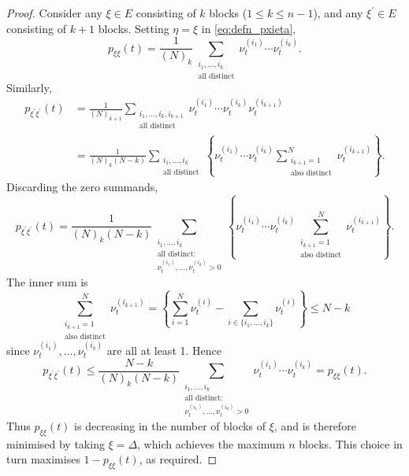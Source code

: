 \begin{proof}
Consider any $\xi \in E$ consisting of $k$ blocks ($1\leq k\leq n-1$), and any $\xi^\prime\in E$ consisting of $k+1$ blocks. 
Setting $\eta=\xi$ in \eqref{eq:defn_pxieta},
\begin{equation*}
p_{\xi\xi}(t) 
= \frac{1}{(N)_k} \sum_{\substack{i_1,\dots,i_k \\ \text{all distinct}}} 
        \nu_t^{(i_1)} \cdots \nu_t^{(i_k)} .
\end{equation*}
Similarly,
\begin{align*}
p_{\xi^\prime\xi^\prime}(t) &= \frac{1}{(N)_{k+1}} 
        \sum_{\substack{i_1,\dots,i_k, i_{k+1} \\ \text{all distinct}}} 
        \nu_t^{(i_1)} \cdots \nu_t^{(i_k)} \nu_t^{(i_{k+1})} \\
&= \frac{1}{(N)_k(N-k)} \sum_{\substack{i_1,\dots,i_k \\ \text{all distinct}}} 
        \left\{ \nu_t^{(i_1)} \cdots \nu_t^{(i_k)} 
        \sum_{\substack{i_{k+1}=1 \\ \text{also distinct}}}^N 
        \nu_t^{(i_{k+1})} \right\} .
\end{align*}
Discarding the zero summands,
\begin{equation*}
p_{\xi^\prime\xi^\prime}(t) 
= \frac{1}{(N)_k(N-k)} \sum_{\substack{i_1,\dots,i_k \\ \text{all distinct:} \\
        \nu_t^{(i_1)},\dots,\nu_t^{(i_k)} > 0 }} 
        \left\{ \nu_t^{(i_1)} \cdots \nu_t^{(i_k)} 
        \sum_{\substack{i_{k+1}=1 \\ 
        \text{also distinct}}}^N \nu_t^{(i_{k+1})} \right\} .
\end{equation*}
The inner sum is
\begin{equation*}
\sum_{\substack{i_{k+1}=1 \\ \text{also distinct}}}^N \nu_t^{(i_{k+1})} 
= \left\{ \sum_{i=1}^N \nu_t^{(i)} -  \sum_{i\in\{i_1,\dots,i_k\} } 
        \nu_t^{(i)} \right\}
\leq N - k
\end{equation*}
since $\nu_t^{(i_1)},\dots,\nu_t^{(i_k)} $ are all at least 1.
Hence
\begin{equation*}
p_{\xi^\prime\xi^\prime}(t)
\leq  \frac{N-k}{(N)_k(N-k)} \sum_{\substack{i_1,\dots,i_k \\ \text{all distinct:} \\ \nu_t^{(i_1)},\dots,\nu_t^{(i_k)} > 0 }} \nu_t^{(i_1)} \cdots \nu_t^{(i_k)} 
= p_{\xi\xi}(t) .
\end{equation*}
Thus $p_{\xi\xi}(t)$ is decreasing in the number of blocks of $\xi$, and is therefore minimised by taking $\xi = \Delta$, which achieves the maximum $n$ blocks. This choice in turn maximises $1-p_{\xi\xi}(t)$, as required.
\end{proof}




